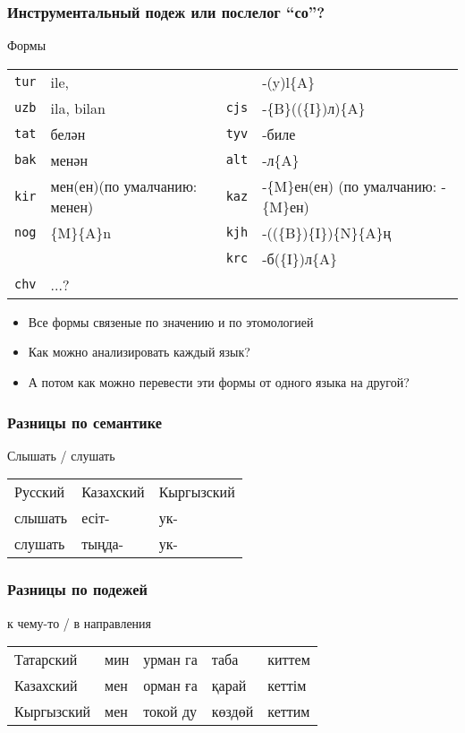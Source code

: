 \documentclass[10pt,xetex]{beamer} %
\begin{document}
\begin{frame}
	\frametitle{Инструментальный подеж или послелог ``со''?}
	\begin{block}{Формы}
	\begin{tabular}{lp{13em}lp{13em}}
		\texttt{tur} & ile, &  & -(y)l\{A\} \\
		\texttt{uzb} & ila, bilan & \texttt{cjs} & -\{B\}((\{I\})л)\{A\} \\
		\texttt{tat} & белән & \texttt{tyv} & -биле \\
		\texttt{bak} & менән & \texttt{alt} & -л\{A\} \\
		\texttt{kir} & мен(ен)\newline (по умалчанию: менен) & \texttt{kaz} & -\{M\}ен(ен) \newline (по умалчанию: -\{M\}ен) \\	
		\texttt{nog} & \{M\}\{A\}n & \texttt{kjh} & -((\{B\})\{I\})\{N\}\{A\}ң \\
		& & \texttt{krc} & -б(\{I\})л\{A\} \\
		\texttt{chv} & ...? & \\
	\end{tabular}
	\end{block}

	\begin{block}{}
		\begin{itemize}
			\item Все формы связеные по значению и по этомологией
			\item Как можно анализировать каждый язык?
			\item А потом как можно перевести эти формы от одного языка на другой?
		\end{itemize}
	\end{block}
\end{frame}

\begin{frame}
	\frametitle{Разницы по семантике}
	\begin{block}{Слышать / слушать}
		\begin{tabular}{lll}
			Русский & Казахский & Кыргызский \\
			слышать & есіт- & ук- \\
			слушать & тыңда- & ук- \\
		\end{tabular}
	\end{block}
\end{frame}

\begin{frame}
	\frametitle{Разницы по подежей}
	\begin{block}{к чему-то / в направления}
		\begin{tabular}{lllll}
			Татарский & мин & урман{\color{blue} га} & таба & киттем \\
			Казахский & мен & орман{\color{blue} ға} & қарай & кеттім \\
			Кыргызский & мен & токой{\color{blue} ду} & көздөй & кеттим \\
		\end{tabular}
	\end{block}
\end{frame}
\end{document}
